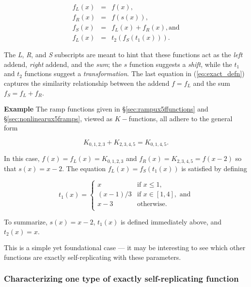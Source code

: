 \documentclass[]{article}
\begin{document}
\begin{equation}\begin{array}{rcl}
  f_L(x) & = & f(x), \\
  f_R(x) & = & f(s(x)), \\
  f_S(x) & = & f_L(x) + f_R(x), \text{and} \\
  f_L(x) & = & t_2(f_S(t_1(x))).
\end{array}\label{eq:exact_defn}\end{equation}

The \emph{L}, \emph{R}, and \emph{S} subscripts are meant to hint that
these functions act as the \emph{left} addend, \emph{right} addend, and
the \emph{sum}; the \(s\) function suggests a \emph{shift}, while the
\(t_1\) and \(t_2\) functions suggest a \emph{transformation}. The last
equation in (\ref{eq:exact_defn}) captures the similarity relationship
between the addend \(f = f_L\) and the sum \(f_S = f_L + f_R\).

\textbf{Example} The ramp functions given in
§\ref{sec:rampux5ffunctions} and §\ref{sec:nonlinearux5framps}, viewed
as \(K-\)functions, all adhere to the general form

\[K_{0,1,2,3} + K_{2,3,4,5} = K_{0,1,4,5}.\]

In this case, \(f(x) = f_L(x) = K_{0,1,2,3}\) and
\(f_R(x) = K_{2,3,4,5} = f(x-2)\) so that \(s(x) = x - 2\). The equation
\(f_L(x) = f_S(t_1(x))\) is satisfied by defining

\[t_1(x) =
\begin{cases}
  x           &   \text{if } x \le 1,                  \\
  (x - 1)/3   &   \text{if } x \in [1,4], \text{ and}  \\
  x-3         &   \text{otherwise.}                    \\
\end{cases}\]

To summarize, \(s(x) = x - 2\), \(t_1(x)\) is defined immediately above,
and \(t_2(x) = x\).

This is a simple yet foundational case --- it may be interesting to see
which other functions are exactly self-replicating with these
parameters.

\subsubsection{Characterizing one type of exactly self-replicating
function}\label{characterizing-one-type-of-exactly-self-replicating-function}
\end{document}
